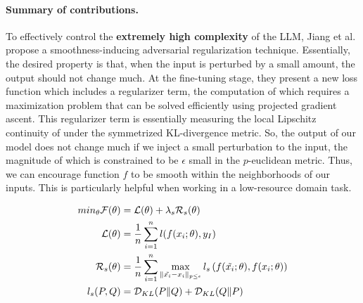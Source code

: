 \documentclass{article}
\begin{document}
  
\paragraph{Summary of contributions.}
To effectively control the \textbf{extremely high complexity} of the LLM, Jiang et al. \cite{smart} propose a smoothness-inducing adversarial regularization technique. Essentially, the desired property is that, when the input is perturbed by a small amount, the output should not change much. At the fine-tuning stage, they present a new loss function which includes a regularizer term, the computation of which requires a maximization problem that can be solved efficiently using projected gradient ascent. This regularizer term is essentially measuring the local Lipschitz continuity of under the symmetrized KL-divergence metric. So, the output of our model does not change much if we inject a small perturbation to the input, the magnitude of which is constrained to be $\epsilon$ small in the $p$-euclidean metric. Thus, we can encourage function $f$ to be smooth within the neighborhoods of our inputs. This is particularly helpful when working in a low-resource domain task. 

\begin{align*}
    min_{\theta} \mathcal{F}(\theta) & = \mathcal{L}(\theta) + \lambda_{s}\mathcal{R}_{s}(\theta) \\
    \mathcal{L}(\theta) & = \frac{1}{n} \sum_{i=1}^{n} l(f(x_{i};\theta), y_{I}) \\
    \mathcal{R}_{s}(\theta) & = \frac{1}{n} \sum_{i=1}^{n} \max_{\lVert \Tilde{x_{i}} - x_{i} \rVert_{p \leq \epsilon}} l_{s}\left(f(\Tilde{x_{i}}; \theta), f(x_{i}; \theta)\right) \\
    l_{s}(P, Q) & = \mathcal{D}_{KL}(P \lVert Q) + \mathcal{D}_{KL}(Q \lVert P)
\end{align*}
\end{document}
